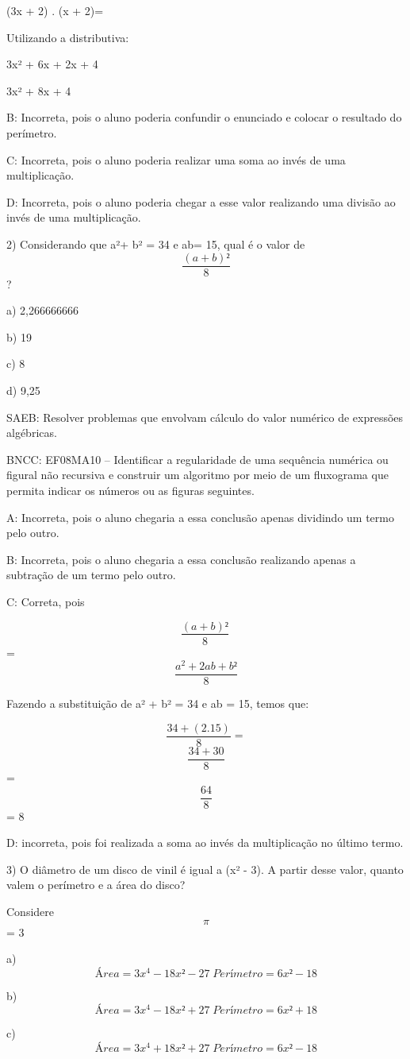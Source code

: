 (3x + 2) . (x + 2)=

Utilizando a distributiva:

3x² + 6x + 2x + 4

3x² + 8x + 4

B: Incorreta, pois o aluno poderia confundir o enunciado e colocar o
resultado do perímetro.

C: Incorreta, pois o aluno poderia realizar uma soma ao invés de uma
multiplicação.

D: Incorreta, pois o aluno poderia chegar a esse valor realizando uma
divisão ao invés de uma multiplicação.

2) Considerando que a²+ b² = 34 e ab= 15, qual é o valor de
\[\frac{(a + b)²}{8}\] ?

a) 2,266666666

b) 19

c) 8

d) 9,25

SAEB: Resolver problemas que envolvam cálculo do valor numérico de
expressões algébricas.

BNCC: EF08MA10 -- Identificar a regularidade de uma sequência numérica
ou figural não recursiva e construir um algoritmo por meio de um
fluxograma que permita indicar os números ou as figuras seguintes.

A: Incorreta, pois o aluno chegaria a essa conclusão apenas dividindo um
termo pelo outro.

B: Incorreta, pois o aluno chegaria a essa conclusão realizando apenas a
subtração de um termo pelo outro.

C: Correta, pois

\[\frac{(a + b)²}{8}\ \] = \[\frac{a^{2} + 2ab + b²}{8}\]

Fazendo a substituição de a² + b² = 34 e ab = 15, temos que:

\[\frac{34 + (2.15)}{8} =\] \[\frac{34 + 30}{8}\] = \[\frac{64}{8}\] = 8

D: incorreta, pois foi realizada a soma ao invés da multiplicação no
último termo.

3) O diâmetro de um disco de vinil é igual a (x² - 3). A partir desse
valor, quanto valem o perímetro e a área do disco?

Considere \[\pi\] = 3

a) \[Área = 3x^4 - 18x² - 27 \;Perímetro= 6x² - 18\]

b) \[Área = 3x^4 - 18x² + 27 \;Perímetro= 6x² + 18\]

c) \[Área = 3x^4 + 18x² + 27 \;Perímetro= 6x² - 18\]

